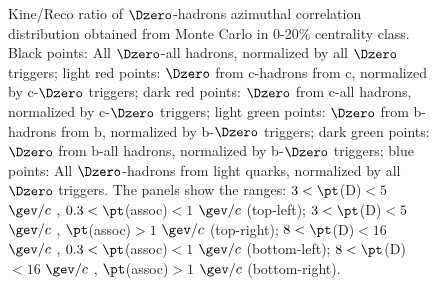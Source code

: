 \begin{figure}
\caption{Kine/Reco ratio of $\Dzero$-hadrons azimuthal correlation distribution obtained from Monte Carlo in 0-20$\%$ centrality class. Black points: All $\Dzero$-all hadrons, normalized by all $\Dzero$ triggers; light red points: $\Dzero$ from c-hadrons from c, normalized by c-$\Dzero$ triggers; dark red points: $\Dzero$ from c-all hadrons, normalized by c-$\Dzero$ triggers; light green points: $\Dzero$ from b-hadrons from b, normalized by b-$\Dzero$ triggers; dark green points: $\Dzero$ from b-all hadrons, normalized by b-$\Dzero$ triggers; blue points: All $\Dzero$-hadrons from light quarks, normalized by all $\Dzero$ triggers.
The panels show the ranges: $3 < \pt$(D)$ < 5$ $\gev/c$ , $0.3 < \pt$(assoc)$ < 1$ $\gev/c$  (top-left); $3 < \pt$(D)$ < 5$ $\gev/c$ , $\pt$(assoc)$ > 1$ $\gev/c$  (top-right); $8 < \pt$(D)$ < 16$ $\gev/c$ , $0.3 < \pt$(assoc)$ < 1$ $\gev/c$  (bottom-left); $8 < \pt$(D)$ < 16$ $\gev/c$ , $\pt$(assoc)$ > 1$ $\gev/c$  (bottom-right).}
\label{fig:MC_Kine_020}
\end{figure}

